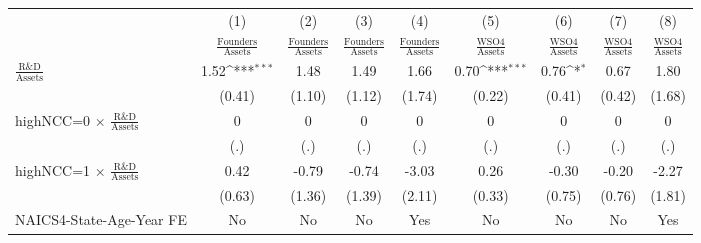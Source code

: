 {
\def\sym#1{\ifmmode^{#1}\else\(^{#1}\)\fi}
\begin{tabular}{l*{8}{c}}
\toprule
                    &\multicolumn{1}{c}{(1)}&\multicolumn{1}{c}{(2)}&\multicolumn{1}{c}{(3)}&\multicolumn{1}{c}{(4)}&\multicolumn{1}{c}{(5)}&\multicolumn{1}{c}{(6)}&\multicolumn{1}{c}{(7)}&\multicolumn{1}{c}{(8)}\\
                    &\multicolumn{1}{c}{$\frac{\textrm{Founders}}{\textrm{Assets}}$}&\multicolumn{1}{c}{$\frac{\textrm{Founders}}{\textrm{Assets}}$}&\multicolumn{1}{c}{$\frac{\textrm{Founders}}{\textrm{Assets}}$}&\multicolumn{1}{c}{$\frac{\textrm{Founders}}{\textrm{Assets}}$}&\multicolumn{1}{c}{$\frac{\textrm{WSO4}}{\textrm{Assets}}$}&\multicolumn{1}{c}{$\frac{\textrm{WSO4}}{\textrm{Assets}}$}&\multicolumn{1}{c}{$\frac{\textrm{WSO4}}{\textrm{Assets}}$}&\multicolumn{1}{c}{$\frac{\textrm{WSO4}}{\textrm{Assets}}$}\\
\midrule
$\frac{\textrm{R\&D}}{\textrm{Assets}}$&        1.52\sym{***}&        1.48         &        1.49         &        1.66         &        0.70\sym{***}&        0.76\sym{*}  &        0.67         &        1.80         \\
                    &      (0.41)         &      (1.10)         &      (1.12)         &      (1.74)         &      (0.22)         &      (0.41)         &      (0.42)         &      (1.68)         \\
\addlinespace
highNCC=0 $\times$ $\frac{\textrm{R\&D}}{\textrm{Assets}}$&           0         &           0         &           0         &           0         &           0         &           0         &           0         &           0         \\
                    &         (.)         &         (.)         &         (.)         &         (.)         &         (.)         &         (.)         &         (.)         &         (.)         \\
\addlinespace
highNCC=1 $\times$ $\frac{\textrm{R\&D}}{\textrm{Assets}}$&        0.42         &       -0.79         &       -0.74         &       -3.03         &        0.26         &       -0.30         &       -0.20         &       -2.27         \\
                    &      (0.63)         &      (1.36)         &      (1.39)         &      (2.11)         &      (0.33)         &      (0.75)         &      (0.76)         &      (1.81)         \\
\addlinespace
NAICS4-State-Age-Year FE&          No         &          No         &          No         &         Yes         &          No         &          No         &          No         &         Yes         \\

\end{tabular}}
